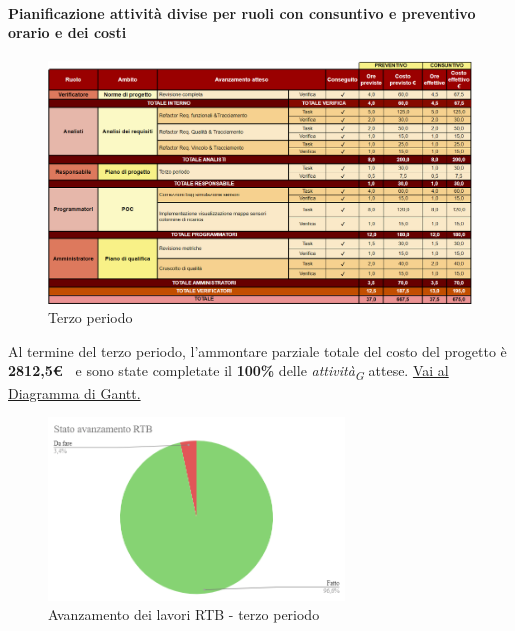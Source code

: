 \newpage
\paragraph{Pianificazione attività divise per ruoli con consuntivo e preventivo orario e dei costi}\hspace{1pt}

\begin{figure}[H]
    \centering
    \includegraphics[width=\linewidth, height=0.9\textheight, keepaspectratio]{../Images/periodo3.PNG}
    \caption{Terzo periodo}
    \label{fig:Terzo_periodo}
\end{figure}


Al termine del terzo periodo, l'ammontare parziale totale del costo del progetto è \textbf{ 2812,5\euro\ } e sono state completate il \textbf{100\%} delle \textit{attività}\textsubscript{\textit{G}} attese.
\href{https://github.com/orgs/ByteOps-swe/projects/3/views/1?sortedBy%5Bdirection%5D=asc&sortedBy%5BcolumnId%5D=64182560}{Vai al Diagramma di Gantt.}\hspace{1pt}


\begin{figure}[H]
    \centering
    \begin{minipage}[b]{0.70\textwidth}
        \centering
        \includegraphics[width=0.7\textwidth]{../Images/avanzamento3Periodo.png}
        \caption{Avanzamento dei lavori RTB - terzo periodo}
        \label{fig:Avanzamento_RTB_3}
    \end{minipage}
\end{figure}

